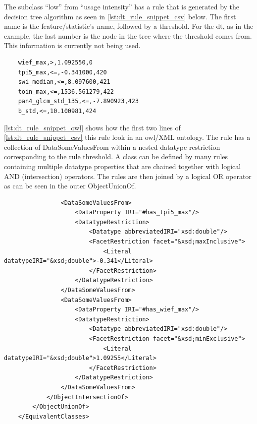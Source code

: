 \documentclass[authoryear,preprint,12pt,number]{elsarticle}
\begin{document}
The subclass ``low'' from ``usage intensity'' has a rule that is generated by 
the decision tree algorithm as seen in \ref{lst:dt_rule_snippet_csv} below. The 
first name is the feature/statistic's name, followed by a threshold. For the 
\gls{dt}, as in the example, the last number is the node in the tree where the 
threshold comes from. This information is currently not being used.

\lstset{language=XML,tabsize=2, label=lst:dt_rule_snippet_csv, caption=\lstname}
\begin{lstlisting}
    wief_max,>,1.092550,0
    tpi5_max,<=,-0.341000,420
    swi_median,<=,8.097600,421
    toin_max,<=,1536.561279,422
    pan4_glcm_std_135,<=,-7.890923,423
    b_std,<=,10.100981,424
\end{lstlisting}
\ref{lst:dt_rule_snippet_owl} shows how the first two lines of 
\ref{lst:dt_rule_snippet_csv} this rule look in an \gls{owl}/XML ontology. The 
rule has a collection of DataSomeValuesFrom within a nested datatype restriction 
corresponding to the rule threshold. A class can be defined by many rules 
containing multiple datatype properties that are chained together with logical 
AND (intersection) operators. The rules are then joined by a logical OR operator 
as can be seen in the outer ObjectUnionOf. 

\lstset{language=XML,tabsize=2, label=lst:dt_rule_snippet_owl, 
caption=\lstname}
\begin{lstlisting}
                <DataSomeValuesFrom>
                    <DataProperty IRI="#has_tpi5_max"/>
                    <DatatypeRestriction>
                        <Datatype abbreviatedIRI="xsd:double"/>
                        <FacetRestriction facet="&xsd;maxInclusive">
                            <Literal datatypeIRI="&xsd;double">-0.341</Literal>
                        </FacetRestriction>
                    </DatatypeRestriction>
                </DataSomeValuesFrom>
                <DataSomeValuesFrom>
                    <DataProperty IRI="#has_wief_max"/>
                    <DatatypeRestriction>
                        <Datatype abbreviatedIRI="xsd:double"/>
                        <FacetRestriction facet="&xsd;minExclusive">
                            <Literal datatypeIRI="&xsd;double">1.09255</Literal>
                        </FacetRestriction>
                    </DatatypeRestriction>
                </DataSomeValuesFrom>
            </ObjectIntersectionOf>
        </ObjectUnionOf>
    </EquivalentClasses>
\end{lstlisting}
\end{document}
